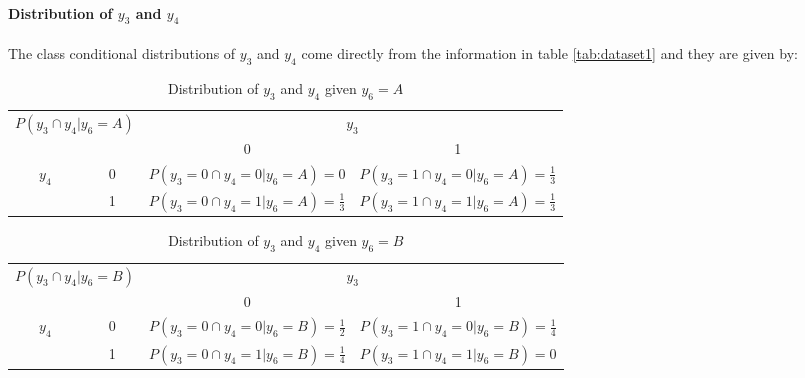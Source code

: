 \documentclass{article}
\begin{document}
\paragraph{Distribution of $y_3$ and $y_4$}
\paragraph{}

The class conditional distributions of $y_3$ and $y_4$ come directly from the information in table \ref{tab:dataset1} and they are given by:

\begin{table}[H]
\centering
\begin{tabular}{|cc|cc|}
\hline
\multicolumn{2}{|c|}{\multirow{2}{*}{$P(y_3 \cap y_4|y_6=A)$}} & \multicolumn{2}{c|}{$y_3$}                     \\ \cline{3-4} 
\multicolumn{2}{|c|}{}                                   & \multicolumn{1}{c|}{0}           & 1           \\ \hline
\multicolumn{1}{|c|}{\multirow{2}{*}{$y_4$}}     & 0     & \multicolumn{1}{c|}{$P(y_3=0 \cap y_4=0|y_6=A) =0$} & $P(y_3=1 \cap y_4=0|y_6=A) = \frac{1}{3}$ \\ \cline{2-4} 
\multicolumn{1}{|c|}{}                           & 1     & \multicolumn{1}{c|}{$P(y_3=0 \cap y_4=1|y_6=A) =\frac{1}{3}$} & $P(y_3=1 \cap y_4=1|y_6=A) =\frac{1}{3}$ \\ \hline
\end{tabular}
\caption{Distribution of $y_3$ and $y_4$ given $y_6=A$}
\end{table}

\begin{table}[H]
\centering
\begin{tabular}{|cc|cc|}
\hline
\multicolumn{2}{|c|}{\multirow{2}{*}{$P(y_3 \cap y_4|y_6=B)$}} & \multicolumn{2}{c|}{$y_3$}                     \\ \cline{3-4}
\multicolumn{2}{|c|}{}                                   & \multicolumn{1}{c|}{0}           & 1           \\ \hline
\multicolumn{1}{|c|}{\multirow{2}{*}{$y_4$}}     & 0     & \multicolumn{1}{c|}{$P(y_3=0 \cap y_4=0|y_6=B) = \frac{1}{2}$} & $P(y_3=1 \cap y_4=0|y_6=B) =\frac{1}{4}$ \\ \cline{2-4} 
\multicolumn{1}{|c|}{}                           & 1     & \multicolumn{1}{c|}{$P(y_3=0 \cap y_4=1|y_6=B) =\frac{1}{4}$} & $P(y_3=1 \cap y_4=1|y_6=B) =0$ \\ \hline
\end{tabular}
\caption{Distribution of $y_3$ and $y_4$ given $y_6=B$}
\end{table}
\end{document}
